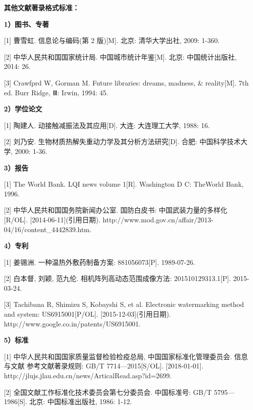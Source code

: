 
{\bfseries 其他文献著录格式标准：}

\begingroup
\fontsize{10pt}{13pt}\selectfont\fangsong
\setlength{\parindent}{0pt}

{\bfseries 1）图书、专著}\par
{[1]} 曹雪虹. 信息论与编码(第 2 版)[M]. 北京: 清华大学出社, 2009: 1-360.\par
{[2]} 中华人民共和国国家统计局. 中国城市统计年鉴[M]. 北京: 中国统计出版社, 2014: 26.\par
{[3]} Crawfprd W, Gorman M. Future libraries: dreams, madness, \& reality[M]. 7th ed. Burr Ridge, Ⅲ: Irwin, 1994: 45.\par

{\bfseries 2）学位论文}\par
{[1]} 陶建人. 动接触减振法及其应用[D]. 大连: 大连理工大学, 1988: 16.\par
{[2]} 刘乃安. 生物材质热解失重动力学及其分析方法研究[D]. 合肥: 中国科学技术大学, 2000: 1-36.\par

{\bfseries 3）报告}\par
{[1]} The World Bank. LQI news volume 1[R]. Washington D C: TheWorld Bank, 1996.\par
{[2]} 中华人民共和国国务院新闻办公室. 国防白皮书: 中国武装力量的多样化[R/OL]. [2014-06-11](引用日期). http://www.mod.gov.cn/affair/2013-04/16/content\_4442839.htm.\par

{\bfseries 4）专利}\par
{[1]} 姜锡洲. 一种温热外敷药制备方案: 881056073[P]. 1989-07-26.\par
{[2]} 白本督, 刘颖, 范九伦. 相机阵列高动态范围成像方法: 201510129313.1[P]. 2015-03-24.\par
{[3]} Tachibana R, Shimizu S, Kobayshi S, et al. Electronic watermarking method and system: US6915001[P/OL]. [2015-12-03](引用日期). http://www.google.co.in/patents/US6915001.\par

{\bfseries 5）标准}\par
{[1]} 中华人民共和国国家质量监督检验检疫总局, 中国国家标准化管理委员会. 信息与文献 参考文献著录规则: GB/T 7714—2015[S/OL]. [2018-01-01]. http://jlujs.jlau.edu.cn/news/ArticalRead.asp?id=2699.\par
{[2]} 全国文献工作标准化技术委员会第七分委员会. 中国标准号: GB/T 5795—1986[S]. 北京: 中国标准出版社, 1986: 1-12.\par


